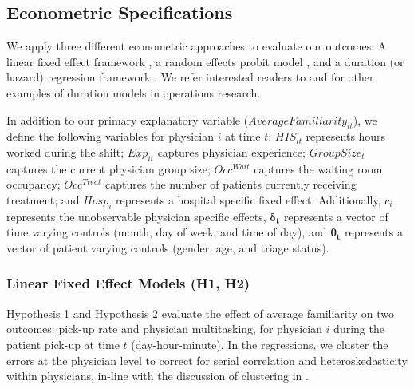  \subsection{Econometric Specifications} \label{em_spec}
 We apply three different econometric approaches to evaluate our outcomes: A linear fixed effect framework \citep[Ch. 10]{Wooldridge2010}, a random effects probit model \citep[Ch. 15]{Wooldridge2010}, and a duration (or hazard) regression framework \citep{Cleves2016}. We refer interested readers to \cite{Batt2017} and \cite{Batt2019} for other examples of duration models in operations research. 
 
 In addition to our primary explanatory variable ($AverageFamiliarity_{it}$), we define the following variables for physician $i$ at time $t$: $HIS_{it}$ represents hours worked during the shift; $Exp_{it}$ captures physician experience; $GroupSize_t$ captures the current physician group size; $Occ^{Wait}$ captures the waiting room occupancy; $Occ^{Treat}$ captures the number of patients currently receiving treatment; and $Hosp_i$ represents a hospital specific fixed effect. Additionally, $c_i$ represents the unobservable physician specific effects, $\boldsymbol{\delta_t}$ represents a vector of time varying controls (month, day of week, and time of day), and $\boldsymbol{\theta_t}$ represents a vector of patient varying controls (gender, age, and triage status).
 
 \subsubsection{Linear Fixed Effect Models (H1, H2)} \label{spec_linear}
 Hypothesis 1 and Hypothesis 2 evaluate the effect of average familiarity on two outcomes: pick-up rate and physician multitasking, for physician $i$ during the patient pick-up at time $t$ (day-hour-minute). In the regressions, we cluster the errors at the physician level to correct for serial correlation and heteroskedasticity within physicians, in-line with the discussion of clustering in \cite{Bertrand2004}. 
 
